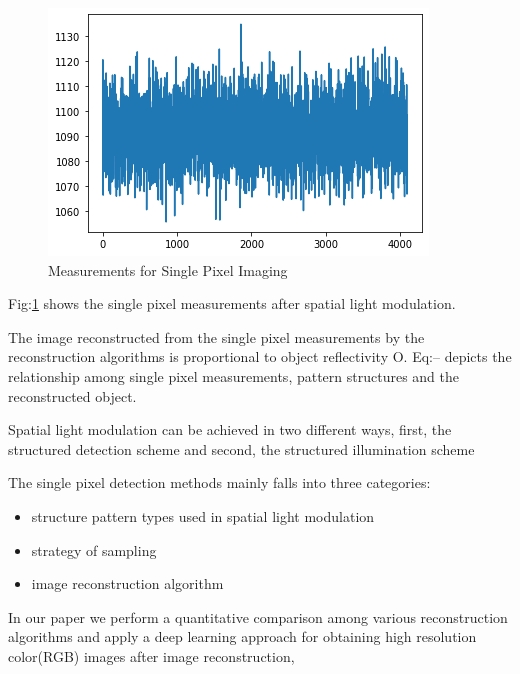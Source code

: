 \documentclass[conference]{IEEEtran}
\begin{document}
\begin{figure}[h]
\includegraphics[scale=0.66]{figures/measurements_graph.png}
\caption{Measurements for Single Pixel Imaging}
\label{fig:measurements_graph}
\end{figure}

Fig:\ref{fig:measurements_graph} shows the single pixel measurements after spatial light modulation.
\par The image reconstructed from the single pixel measurements by the reconstruction algorithms is proportional to object reflectivity O. Eq:-- depicts the relationship among single pixel measurements, pattern structures and the reconstructed object.
\par
Spatial light modulation can be achieved in two different ways, first, the structured detection scheme and second, the structured illumination scheme
\par The single pixel detection methods mainly falls into three categories: \begin{itemize}
\item[1]structure pattern types used in spatial light modulation
\item[2]strategy of sampling
\item[3]image reconstruction algorithm
\end{itemize}

\par In our paper we perform a quantitative comparison among various reconstruction algorithms and apply a deep learning approach for obtaining high resolution color(RGB) images after image reconstruction,
\end{document}
